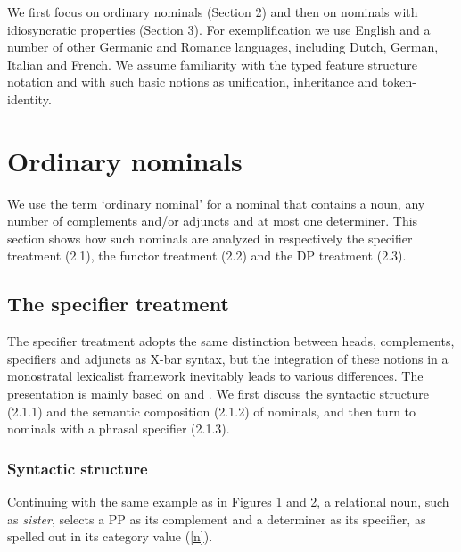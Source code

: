 \documentclass[output=paper]{langsci/langscibook}
\begin{document}
We first focus on ordinary nominals (Section 2) and then on nominals with idiosyncratic 
properties (Section 3). For exemplification we use English and a number of other Germanic 
and Romance languages, including Dutch, German, Italian and French.  
We assume familiarity with the typed feature structure notation and with such basic notions 
as unification, inheritance and token-identity. 
    

\section{Ordinary nominals} 


We use the term `ordinary nominal' for a nominal that contains a noun, 
any number of complements and/or adjuncts and at most one determiner. 
This section shows how such nominals are analyzed in respectively the 
specifier treatment (2.1), the functor treatment (2.2) and the DP treatment (2.3).  

    
\subsection{The specifier treatment} 


The specifier treatment adopts the same distinction between heads, complements, 
specifiers and adjuncts as X-bar syntax, but the integration of these notions 
in a monostratal lexicalist framework inevitably leads to various differences. 
The presentation is mainly based on \citet{PS94} and \citet{GS00}. 
We first discuss the syntactic structure (2.1.1) and the semantic composition (2.1.2) 
of nominals, and then turn to nominals with a phrasal specifier (2.1.3). 


\subsubsection{Syntactic structure}


Continuing with the same example as in Figures 1 and 2, 
a relational noun, such as {\it sister\/}, selects a PP as its complement 
and a determiner as its specifier, as spelled out in its {\sc category} value
(\ref{n}). 

\begin{exe} 
\ex\label{n}
\begin{avm}
\end{avm}
\end{exe}
\end{document}
